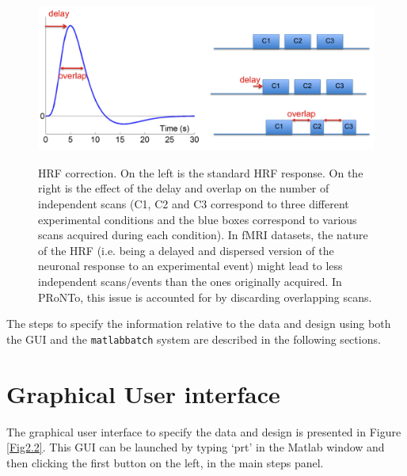 \begin{figure}[!h]
  \begin{center}
      \includegraphics[height=2.2in]{images/Figure1.png}
   \caption{HRF correction. On the left is the standard HRF response. On the right is the effect of the delay and overlap on the number of independent scans (C1, C2 and C3 correspond to three different experimental conditions and the blue boxes correspond to various scans acquired during each condition). In fMRI datasets, the nature of the HRF (i.e. being a delayed and dispersed version of the neuronal response to an experimental event) might lead to less independent scans/events than the ones originally acquired. In PRoNTo, this issue is accounted for by discarding overlapping scans.}
    \label{Fig2.1}
  \end{center}
\end{figure}

The steps to specify the information relative to the data and design using both the GUI and the {\tt matlabbatch} system are described in the following sections.

\section{Graphical User interface}

The graphical user interface to specify the data and design is presented in Figure \ref{Fig2.2}. This GUI can be launched by typing `prt' in the Matlab window and then clicking the first button on the left, in the main steps panel.

